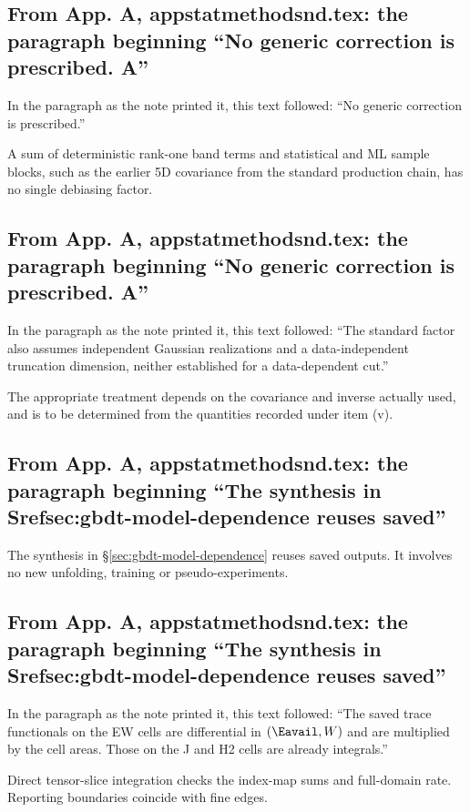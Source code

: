 \subsection{From App. A, appstatmethodsnd.tex: the paragraph beginning ``No generic correction is prescribed. A''}
In the paragraph as the note printed it, this text followed: ``No generic correction is prescribed.''\par
A sum of deterministic rank-one band terms and statistical and ML sample blocks, such as the earlier 5D covariance from the standard production chain, has no single debiasing factor.

\subsection{From App. A, appstatmethodsnd.tex: the paragraph beginning ``No generic correction is prescribed. A''}
In the paragraph as the note printed it, this text followed: ``The standard factor also assumes independent Gaussian realizations and a data-independent truncation dimension, neither established for a data-dependent cut.''\par
The appropriate treatment depends on the covariance and inverse actually used, and is to be determined from the quantities recorded under item (v).

\subsection{From App. A, appstatmethodsnd.tex: the paragraph beginning ``The synthesis in Srefsec:gbdt-model-dependence reuses saved''}
The synthesis in \S\ref{sec:gbdt-model-dependence} reuses saved outputs. It involves no new unfolding, training or pseudo-experiments.

\subsection{From App. A, appstatmethodsnd.tex: the paragraph beginning ``The synthesis in Srefsec:gbdt-model-dependence reuses saved''}
In the paragraph as the note printed it, this text followed: ``The saved trace functionals on the EW cells are differential in $(\Eavail,W)$ and are multiplied by the cell areas. Those on the J and H2 cells are already integrals.''\par
Direct tensor-slice integration checks the index-map sums and full-domain rate. Reporting boundaries coincide with fine edges.

